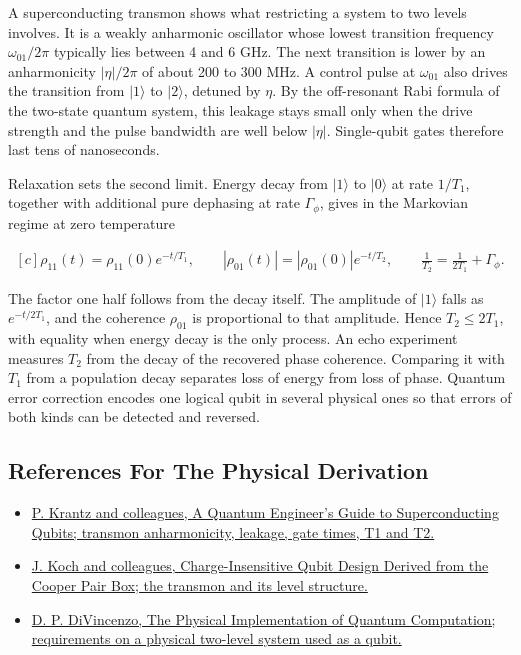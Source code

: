 \documentclass[11pt,oneside]{book}
\newenvironment{centeredalign}{\[\begin{gathered}[c]}{\end{gathered}\]}
\newcommand{\ket}[1]{\lvert #1\rangle}
\begin{document}
A superconducting transmon shows what restricting a system to two levels involves. It is a weakly anharmonic oscillator whose lowest transition frequency \(\omega_{01}/2\pi\) typically lies between 4 and 6 GHz. The next transition is lower by an anharmonicity \(|\eta|/2\pi\) of about 200 to 300 MHz. A control pulse at \(\omega_{01}\) also drives the transition from \(\ket1\) to \(\ket2\), detuned by \(\eta\). By the off-resonant Rabi formula of the two-state quantum system, this leakage stays small only when the drive strength and the pulse bandwidth are well below \(|\eta|\). Single-qubit gates therefore last tens of nanoseconds.

Relaxation sets the second limit. Energy decay from \(\ket1\) to \(\ket0\) at rate \(1/T_1\), together with additional pure dephasing at rate \(\Gamma_\phi\), gives in the Markovian regime at zero temperature

\begin{centeredalign}
\rho_{11}(t)=\rho_{11}(0)e^{-t/T_1},\qquad |\rho_{01}(t)|=|\rho_{01}(0)|e^{-t/T_2},
\qquad \frac{1}{T_2}=\frac{1}{2T_1}+\Gamma_\phi.
\end{centeredalign}

The factor one half follows from the decay itself. The amplitude of \(\ket1\) falls as \(e^{-t/2T_1}\), and the coherence \(\rho_{01}\) is proportional to that amplitude. Hence \(T_2\leq2T_1\), with equality when energy decay is the only process. An echo experiment measures \(T_2\) from the decay of the recovered phase coherence. Comparing it with \(T_1\) from a population decay separates loss of energy from loss of phase. Quantum error correction encodes one logical qubit in several physical ones so that errors of both kinds can be detected and reversed.

\subsection*{References For The Physical Derivation}
\begin{itemize}
\item \href{https://arxiv.org/abs/1904.06560}{P. Krantz and colleagues, A Quantum Engineer's Guide to Superconducting Qubits; transmon anharmonicity, leakage, gate times, T1 and T2.}
\item \href{https://arxiv.org/abs/cond-mat/0703002}{J. Koch and colleagues, Charge-Insensitive Qubit Design Derived from the Cooper Pair Box; the transmon and its level structure.}
\item \href{https://arxiv.org/abs/quant-ph/0002077}{D. P. DiVincenzo, The Physical Implementation of Quantum Computation; requirements on a physical two-level system used as a qubit.}
\end{itemize}
\end{document}
